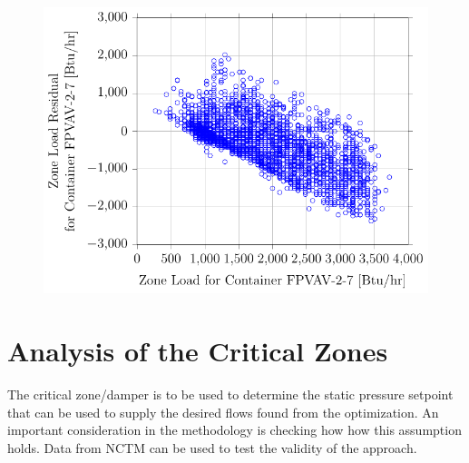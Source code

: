 \begin{figure}
\centering
\includegraphics[]{Plots/2016-09-14-1020-ZoneLoadResidualforContainerFPVAV27vsZoneLoadforContainerFPVAV27.pdf}
\caption{  }
\label{fig:2016-09-14-1020-ZoneLoadResidualforContainerFPVAV27vsZoneLoadforContainerFPVAV27}
\end{figure}



% 




\section{Analysis of the Critical Zones}

The critical zone/damper is to be used to determine the static pressure
setpoint that can be used to supply the desired flows found from the
optimization. An important consideration in the methodology is checking
how how this assumption holds. Data from NCTM can be used to test the
validity of the approach.

